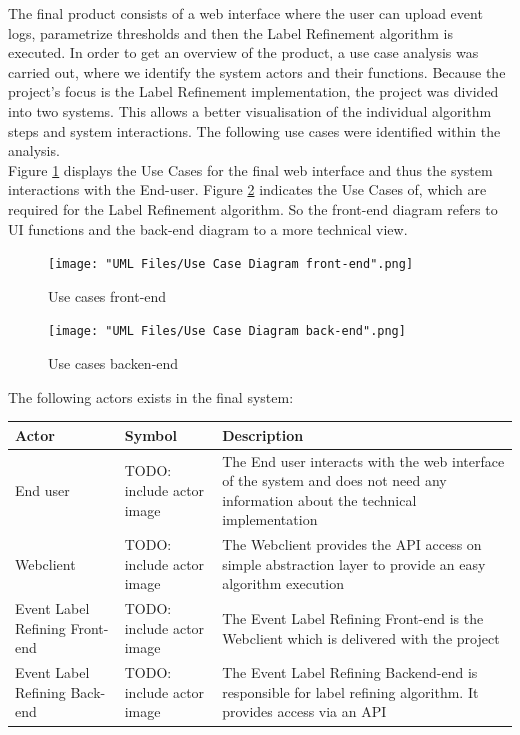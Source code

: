 \documentclass[notitlepage]{article}
\begin{document}
\begin{flushleft}
The final product consists of a web interface where the user can upload event logs, parametrize thresholds and then the Label Refinement algorithm is executed. 
In order to get an overview of the product, a use case analysis was carried out, where we identify the system actors and their functions. 
Because the project's focus is the Label Refinement implementation, the project was divided into two systems. 
This allows a better visualisation of the individual algorithm steps and system interactions. The following use cases were identified within the analysis.\\
\medskip
Figure \ref{fig:front-end} displays the Use Cases for the final web interface and thus the system interactions with the End-user.  
Figure \ref{fig:back-end} indicates the Use Cases of, which are required for the Label Refinement algorithm. So the front-end diagram refers to UI functions  
and the back-end diagram to a more technical view.
\begin{figure}[h!]
  \texttt{[image: "UML Files/Use Case Diagram front-end".png]}
  \caption{Use cases front-end}
  \label{fig:front-end}
\end{figure}

\begin{figure}[h!]
  \texttt{[image: "UML Files/Use Case Diagram back-end".png]}
  \caption{Use cases backen-end}
  \label{fig:back-end}
\end{figure}
\clearpage
The following actors exists in the final system:\\
\medskip
\begin{tabularx}{\textwidth}{|m{3cm}|m{3cm}|m{10cm}|}
	\hline
	\textbf{Actor} 
	&\textbf{Symbol}
	&\textbf{Description}\\
	\hline
	End user & {\color{red} TODO: include actor image} & The End user interacts with the web interface of the system and does not need any information about the technical implementation\\
	\hline
	Webclient & {\color{red} TODO: include actor image} & The Webclient provides the API access on simple abstraction layer to provide an easy algorithm execution\\
	\hline
	Event Label Refining Front-end & {\color{red} TODO: include actor image} & The Event Label Refining Front-end is the Webclient which is delivered with the project \\
	\hline
	Event Label Refining Back-end & {\color{red} TODO: include actor image} & The Event Label Refining Backend-end is responsible for label refining algorithm. It provides access via an API \\
	\hline
\end{tabularx}


\end{flushleft}
\end{document}
